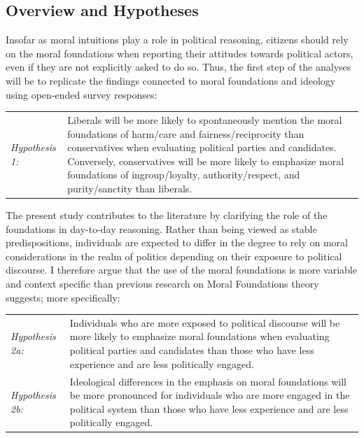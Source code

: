 \documentclass[12pt]{article}
\begin{document}
\subsection{Overview and Hypotheses}

Insofar as moral intuitions play a role in political reasoning, citizens should rely on the moral foundations when reporting their attitudes towards political actors, even if they are not explicitly asked to do so. Thus, the first step of the analyses will be to replicate the findings connected to moral foundations and ideology using open-ended survey responses:

\vspace{0.3cm}
\begin{tabular}{lp{12cm}}
\textsl{Hypothesis 1:} & Liberals will be more likely to spontaneously mention the moral foundations of harm/care and fairness/reciprocity  than conservatives when evaluating political parties and candidates. Conversely, conservatives will be more likely to emphasize moral foundations of ingroup/loyalty, authority/respect, and purity/sanctity than liberals.
\end{tabular}
\vspace{0.5cm}

The present study contributes to the literature by clarifying the role of the foundations in day-to-day reasoning. Rather than being viewed as stable predispositions, individuals are expected to differ in the degree to rely on moral considerations in the realm of politics depending on their exposure to political discourse. I therefore argue that the use of the moral foundations is more variable and context specific than previous research on Moral Foundations theory suggests; more specifically:

\vspace{0.3cm}
\begin{tabular}{lp{12cm}}
\textsl{Hypothesis 2a:} & Individuals who are more exposed to political discourse will be more likely to emphasize moral foundations when evaluating political parties and candidates than those who have less experience and are less politically engaged. \\
\textsl{Hypothesis 2b:} & Ideological differences in the emphasis on moral foundations will be more pronounced for individuals who are more engaged in the political system than those who have less experience and are less politically engaged.
\end{tabular}
\vspace{0.5cm}
\end{document}
